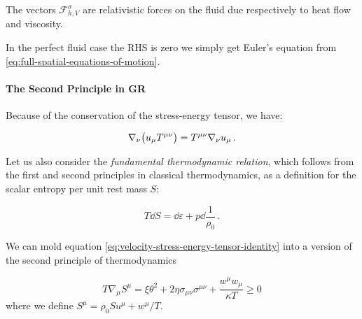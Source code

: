 \documentclass[main.tex]{subfiles}
\begin{document}
The vectors \(\mathscr F^\sigma _{h, V}\) are relativistic forces on the fluid due respectively to heat flow and viscosity.

In the perfect fluid case the RHS is zero we simply get Euler's equation from \eqref{eq:full-spatial-equations-of-motion}.

\paragraph{The Second Principle in GR}


Because of the conservation of the stress-energy tensor, we have:

\begin{equation} \label{eq:velocity-stress-energy-tensor-identity}
    \nabla_\nu \qty(u_\mu T ^{\mu \nu}) = T^{\mu \nu} \nabla_\nu u_\mu \,.
\end{equation}

Let us also consider the \emph{fundamental thermodynamic relation}, which follows from the first and second principles in classical thermodynamics, as a definition for the scalar entropy per unit rest mass \(S\):

\begin{equation} \label{eq:differential-entropy}
    T\dd{S} = \dd{\varepsilon} + p \dd{\frac{1}{\rho_0}} \,.
\end{equation}

\begin{claim}
    We can mold equation \eqref{eq:velocity-stress-energy-tensor-identity} into a version of the second principle of thermodynamics

    \begin{equation} \label{eq:second-principle-thermodynamics}
        T \nabla_\mu S^\mu = \xi \theta^2 + 2 \eta \sigma_{\mu\nu} \sigma^{\mu\nu} + \frac{w^\mu w_\mu}{\kappa T} \geq 0
    \end{equation}
    where we define \(S^\mu = \rho_0 S u^\mu + w^\mu /T\).
\end{claim}
\end{document}
